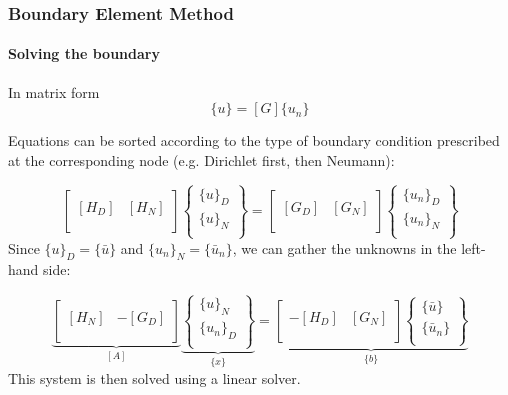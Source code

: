 \documentclass[10pt,xcolor=pdftex,dvipsnames,table]{beamer}
\begin{document}
\begin{frame}
	\frametitle{ Boundary Element Method }
	\framesubtitle{ Solving the boundary }
	
	In matrix form
	\begin{equation*}
		[H] \{u\} = [G] \{u_n\}
	\end{equation*}	
	
	Equations can be sorted according to the type of boundary condition  prescribed at the corresponding node (e.g. Dirichlet first, then Neumann):

	\begin{equation*}
		\begin{bmatrix}
			\qquad\\
			[H_{D}] & [H_N] \\
			\qquad\\
		\end{bmatrix}
		\begin{Bmatrix}
			\{u\}_D \\
			\{u\}_N \\
		\end{Bmatrix}
		=
		\begin{bmatrix}
			\qquad\\
			[G_{D}] & [G_N] \\
			\qquad\\
		\end{bmatrix}
		\begin{Bmatrix}
			\{u_n\}_D \\
			\{u_n\}_N \\
		\end{Bmatrix}
	\end{equation*}	
	Since $\{u\}_D = \{\bar{u}\}$ and $\{u_n\}_N  = \{\bar{u}_n\}$, we can gather the unknowns in the left-hand side:

	\begin{equation*}
	\underbrace{
	\begin{bmatrix}
		\qquad\\
		[H_N] & -[G_D] \\
		\qquad\\
	\end{bmatrix}
}_{[A]}
	\underbrace{
	\begin{Bmatrix}
		\{u\}_N \\
		\{u_n\}_D \\
	\end{Bmatrix}
}_{\{x\}}
	=
	\underbrace{
	\begin{bmatrix}
		\qquad\\
		-[H_{D}] & [G_N] \\
		\qquad\\
	\end{bmatrix}
	\begin{Bmatrix}
		\{\bar{u}\} \\
		\{\bar{u}_n\} \\
	\end{Bmatrix}
}_{ \{b\}}
\end{equation*}	
This system is then solved using a linear solver.	
	
\end{frame}
\end{document}
